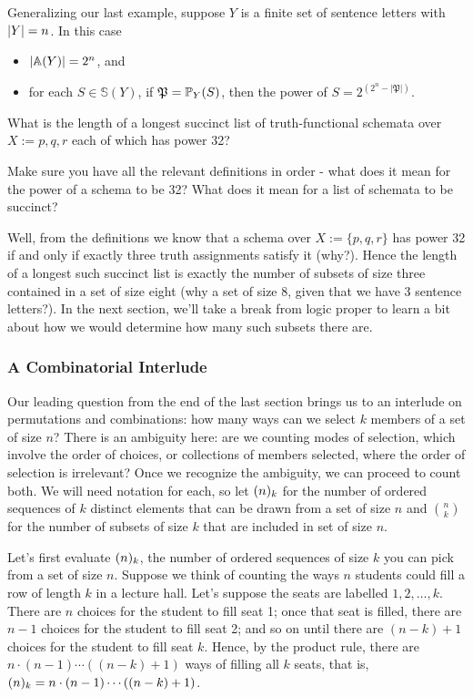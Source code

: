 Generalizing our last example, suppose $Y$ is a finite set of sentence letters with $\size{Y}=n$. In this case
\begin{itemize}
\item $\size{\mathbb{A}(Y)}=2^n$, and 
\item for each $S\in\mathbb{S}(Y)$, if $\mfp=\prop{S}{Y}$, then the power of $S = 2^{(2^n-|\mathfrak{P}|)}$.
\end{itemize}

\begin{example}
    What is the length of a longest succinct list of truth-functional schemata over $X := {p, q, r}$ each of which has power 32?

    \begin{aside}
        Make sure you have all the relevant definitions in order - what does it mean for the power of a schema to be 32? What does it mean for a list of schemata to be succinct?  
    \end{aside}

    Well, from the definitions we know that a schema over $X := \{p, q, r\}$ has power 32 if and only if exactly three truth assignments satisfy it (why?). Hence the length of a longest such succinct list is exactly the number of subsets of size three contained in a set of size eight (why a set of size 8, given that we have 3 sentence letters?). In the next section, we'll take a break from logic proper to learn a bit about how we would determine how many such subsets there are. 
\end{example}

\subsubsection*{A Combinatorial Interlude}
Our leading question from the end of the last section brings us to an interlude on permutations and combinations: how many ways can we select $k$ members of a set of size $n$? There is an ambiguity here: are we counting modes of selection, which involve the order of choices, or collections of members selected, where the order of selection is irrelevant? Once we recognize the ambiguity, we can proceed to count both. We will need notation for each, so let $\oc{n}{k}$ for the number of ordered sequences of $k$ distinct elements that can be drawn from a set of size $n$  and $\binom{n}{k}$ for the number of subsets of size $k$ that are included in set of size $n$. 

Let's first evaluate $\oc{n}{k}$, the number of ordered sequences of size $k$ you can pick from a set of size $n$. Suppose we think of counting the ways $n$ students could fill a row of length $k$ in a lecture hall. Let's suppose the seats are labelled $1, 2, \ldots, k$. There are $n$ choices for the student to fill seat 1; once that seat is filled, there are $n-1$ choices for the student to fill seat 2; and so on until there are $(n-k)+1$ choices for the student to fill seat $k$. Hence, by the product rule, there are $n\cdot(n-1)\cdots((n-k)+1)$ ways of filling all $k$ seats, that is, $\oc{n}{k}=n\cdot(n-1)\cdots((n-k)+1)$. 

